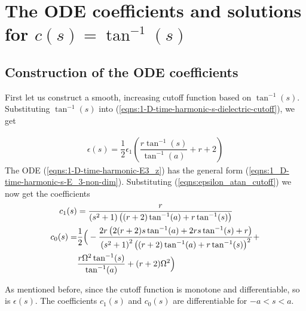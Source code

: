 \documentclass[12pt,twoside]{report}
\begin{document}
\chapter{The ODE coefficients and solutions for $c(s) = \tan^{-1}(s)$   }

\section{Construction of the ODE coefficients}
First let us construct a smooth, increasing cutoff function based on $\tan^{-1}(s)$. Substituting $\tan^{-1}(s)$ into (\ref{eqns:1-D-time-harmonic-s-dielectric-cutoff}), we get

\begin{align}
\label{eqns:epsilon_atan_cutoff}
\epsilon(s) = \dfrac{1}{2} \epsilon_1 \left(\dfrac{r \tan ^{-1}(s)}{\tan^{-1}(a)}+r+2\right)
\end{align}
The ODE (\ref{eqns:1-D-time-harmonic-E3_z}) has the general form (\ref{eqns:1_D-time-harmonic-s-E_3-non-dim}). Substituting (\ref{eqns:epsilon_atan_cutoff}) we now get the coefficients
\begin{subequations}
\begin{align}
c_1(s) &= \dfrac{r}{\left(s^2+1\right) \left((r+2) \tan ^{-1}(a)+r \tan ^{-1}(s)\right)} \label{eqns:1-D-time-harmonic-E3_s_Atan_coef_1_r}\\
c_0(s) = &\dfrac{1}{2} \Big(-\dfrac{2 r \left(2 (r+2) s \tan ^{-1}(a)+2 r s \tan
   ^{-1}(s)+r\right)}{\left(s^2+1\right)^2 \left((r+2) \tan ^{-1}(a)+r \tan
   ^{-1}(s)\right)^2}+\notag\\
   &\dfrac{r \Omega ^2 \tan ^{-1}(s)}{\tan ^{-1}(a)}+(r+2) \Omega
   ^2\Big)
 \label{eqns:1-D-time-harmonic-E3_s_Atan_coef_0_r}
\end{align}
\end{subequations}

As mentioned before, since the cutoff function is monotone and differentiable, so is $\epsilon(s)$. The coefficients $c_1(s)$ and $c_0(s)$ are differentiable for $-a<s<a$.
 
\end{document}
